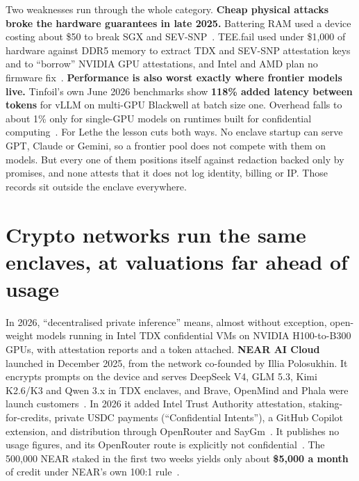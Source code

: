\documentclass[10pt,a4paper]{article}
\begin{document}
Two weaknesses run through the whole category. \textbf{Cheap physical attacks broke the hardware guarantees in late 2025.} Battering RAM used a device costing about \$50 to break SGX and SEV-SNP~\cite{the-hacker-news-battering}. TEE.fail used under \$1,000 of hardware against DDR5 memory to extract TDX and SEV-SNP attestation keys and to ``borrow'' NVIDIA GPU attestations, and Intel and AMD plan no firmware fix~\cite{tee-fail}. \textbf{Performance is also worst exactly where frontier models live.} Tinfoil's own June 2026 benchmarks show \textbf{118\% added latency between tokens} for vLLM on multi-GPU Blackwell at batch size one. Overhead falls to about 1\% only for single-GPU models on runtimes built for confidential computing~\cite{tinfoil-blog-confidential}. For Lethe the lesson cuts both ways. No enclave startup can serve GPT, Claude or Gemini, so a frontier pool does not compete with them on models. But every one of them positions itself against redaction backed only by promises, and none attests that it does not log identity, billing or IP. Those records sit outside the enclave everywhere.

\section{Crypto networks run the same enclaves, at valuations far ahead of usage}

In 2026, ``decentralised private inference'' means, almost without exception, open-weight models running in Intel TDX confidential VMs on NVIDIA H100-to-B300 GPUs, with attestation reports and a token attached. \textbf{NEAR AI Cloud} launched in December 2025, from the network co-founded by Illia Polosukhin. It encrypts prompts on the device and serves DeepSeek V4, GLM 5.3, Kimi K2.6/K3 and Qwen 3.x in TDX enclaves, and Brave, OpenMind and Phala were launch customers~\cite{near-ai-blog-near}. In 2026 it added Intel Trust Authority attestation, staking-for-credits, private USDC payments (``Confidential Intents''), a GitHub Copilot extension, and distribution through OpenRouter and SayGm~\cite{near-ai-blog,cryptobriefing-near-ai-git}. It publishes no usage figures, and its OpenRouter route is explicitly not confidential~\cite{near-ai-blog-openrouter}. The 500,000 NEAR staked in the first two weeks yields only about \textbf{\$5,000 a month} of credit under NEAR's own 100:1 rule~\cite{cryptobriefing-near-ai-sta}.
\end{document}
